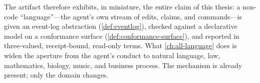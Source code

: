 The artifact therefore exhibits, in miniature, the entire claim of this thesis:
a non-code ``language''---the agent's own stream of edits, claims, and
commands---is given an event-log abstraction (\cref{def:eventlog}), checked
against a declarative model on a conformance surface
(\cref{def:conformance-surface}), and reported in three-valued, receipt-bound,
read-only terms. What \cref{ch:all-language} does is widen the aperture from the
agent's conduct to natural language, law, mathematics, biology, music, and
business process. The mechanism is already present; only the domain changes.
